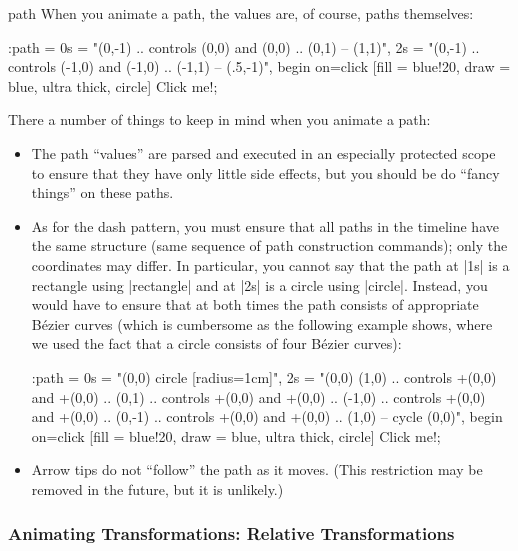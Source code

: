 \begin{tikzanimateattribute}{path}
  When you animate a path, the values are, of course, paths themselves:
\begin{codeexample}[animation list={0.5,1,1.5,2}]
\tikz \node :path = {
        0s = "{(0,-1) .. controls (0,0) and (0,0)   .. (0,1) -- (1,1)}",
        2s = "{(0,-1) .. controls (-1,0) and (-1,0) .. (-1,1) -- (.5,-1)}",
        begin on=click }
  [fill = blue!20, draw = blue, ultra thick, circle] {Click me!}; 
\end{codeexample}
  There a number of things to keep in mind when you animate a path:
  \begin{itemize}
  \item The path ``values'' are parsed and executed in an especially
    protected scope to ensure that they have only little side effects,
    but you should be do ``fancy things'' on these paths.
  \item 
    As for the dash pattern, you must ensure that all paths in the
    timeline have the same structure (same sequence of path construction
    commands); only the coordinates may differ. In particular, you
    cannot say that the path at |1s| is a rectangle using
    |rectangle| and at |2s| is a circle using
    |circle|. Instead, you would have to ensure that at both
    times the path consists of appropriate Bézier curves (which is
    cumbersome as the following example shows, where we used the fact
    that a circle consists of four Bézier curves):
\begin{codeexample}[animation list={0.5,1,1.5,2}]
\tikz \node :path = {
        0s = "{(0,0) circle [radius=1cm]}",
        2s = "{(0,0)
               (1,0) .. controls +(0,0) and +(0,0) .. (0,1)
                     .. controls +(0,0) and +(0,0) .. (-1,0)
                     .. controls +(0,0) and +(0,0) .. (0,-1)
                     .. controls +(0,0) and +(0,0) .. (1,0)
                     -- cycle (0,0)}",
        begin on=click}
  [fill = blue!20, draw = blue, ultra thick, circle] {Click me!}; 
\end{codeexample}
  \item
    Arrow tips do not ``follow'' the path as it moves. (This
    restriction may be removed in the future, but it is unlikely.)
  \end{itemize}
\end{tikzanimateattribute}



\subsubsection{Animating Transformations: Relative Transformations}

